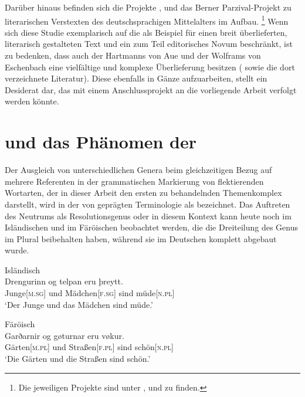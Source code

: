 Darüber hinaus befinden sich die Projekte 
\autocite{iwdigital},  \autocite{ldmdigital} und das
Berner Parzival-Projekt \autocite{parzivalprojekt} zu literarischen Verstexten
des deutschsprachigen Mittelalters im Aufbau.%
%
	\footnote{Die jeweiligen Projekte sind unter ,
	 und  zu finden.}
%
Wenn sich diese Studie exemplarisch auf die \KC{} als Beispiel für einen breit
überlieferten, literarisch gestalteten Text und ein zum Teil editorisches Novum
beschränkt, ist zu bedenken, dass auch der  Hartmanns von
Aue und der  Wolframs von
Eschenbach eine vielfältige und komplexe
Überlieferung besitzen (\cite[vgl.][s.\,v.~\textit{:
}, \textit{: }]{hsc} sowie
die dort verzeichnete Literatur). Diese ebenfalls in Gänze aufzuarbeiten,
stellt ein Desiderat dar, das mit einem Anschlussprojekt an die vorliegende
Arbeit verfolgt werden könnte.

\section{ und das Phänomen der }
\label{sec:einlgendres}

Der Ausgleich von unterschiedlichen Genera beim gleichzeitigen Bezug auf
mehrere Referenten in der grammatischen Markierung von flektierenden Wortarten,
der in dieser Arbeit den ersten zu behandelnden Themenkomplex darstellt, wird
in der von \citet{corbett1983} geprägten Terminologie als  bezeichnet. Das Auftreten des Neutrums als Resolutionsgenus oder
 \autocites{corbett1999}{wechsler2009} in diesem Kontext kann heute
noch im Isländischen  und im
Färöischen  beobachtet werden, die die
Dreiteilung des Genus im Plural beibehalten haben, während sie im
Deutschen komplett abgebaut wurde.

\begin{exe}
\ex \label{ex:modgermbeide}
\begin{xlist}
\ex \label{ex:modgermbeide_1}
	\langinfo%
		{Isländisch}%
		{}%
		{\cites[nach][283]{corbett1991}[569]{wechsler2009}}\\
	\gll Drengurinn og telpan eru þreytt. \\
		Junge[\textsc{m.sg}] und Mädchen[\textsc{f.sg}] sind
		müde[\textsc{n.pl}] \\
	\trans `Der Junge und das Mädchen sind müde.'

\ex \label{ex:modgermbeide_2}
	\langinfo%
		{Färöisch}%
		{}%
		{\cite[nach][225]{thrainsson2004}}\\
	\gll Garðarnir og gøturnar eru vøkur. \\
		Gärten[\textsc{m.pl}] und Straßen[\textsc{f.pl}] sind
		schön[\textsc{n.pl}] \\
	\trans `Die Gärten und die Straßen sind schön.'
\end{xlist}
\end{exe}


